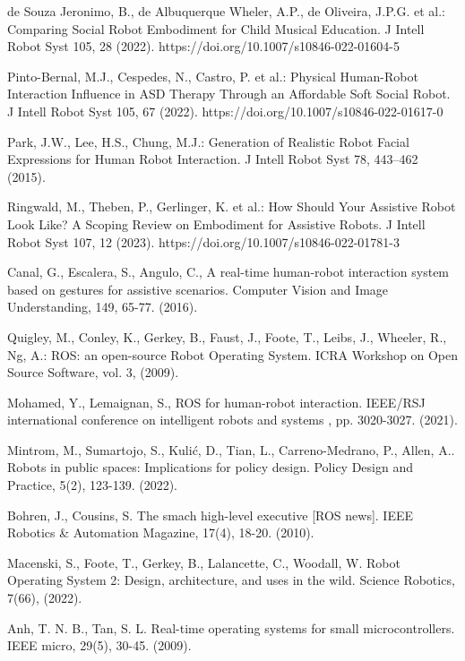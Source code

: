 \documentclass[runningheads]{llncs}
\begin{document}

\begin{thebibliography}{8}
de Souza Jeronimo, B., de Albuquerque Wheler, A.P., de Oliveira, J.P.G. et al.: Comparing Social Robot Embodiment for Child Musical Education. J Intell Robot Syst 105, 28 (2022). https://doi.org/10.1007/s10846-022-01604-5

Pinto-Bernal, M.J., Cespedes, N., Castro, P. et al.: Physical Human-Robot Interaction Influence in ASD Therapy Through an Affordable Soft Social Robot. J Intell Robot Syst 105, 67 (2022). https://doi.org/10.1007/s10846-022-01617-0

Park, J.W., Lee, H.S., Chung, M.J.: Generation of Realistic Robot Facial Expressions for Human Robot Interaction. J Intell Robot Syst 78, 443–462 (2015). 

Ringwald, M., Theben, P., Gerlinger, K. et al.: How Should Your Assistive Robot Look Like? A Scoping Review on Embodiment for Assistive Robots. J Intell Robot Syst 107, 12 (2023). https://doi.org/10.1007/s10846-022-01781-3

Canal, G., Escalera, S., Angulo, C., A real-time human-robot interaction system based on gestures for assistive scenarios. Computer Vision and Image Understanding, 149, 65-77. (2016).

Quigley, M., Conley, K., Gerkey, B., Faust, J., Foote, T., Leibs, J., Wheeler, R., Ng, A.: ROS: an open-source Robot Operating System. ICRA Workshop on Open Source Software, vol. 3, (2009).

Mohamed, Y., Lemaignan, S., ROS for human-robot interaction. IEEE/RSJ international conference on intelligent robots and systems , pp. 3020-3027. (2021).

Mintrom, M., Sumartojo, S., Kulić, D., Tian, L., Carreno-Medrano, P., Allen, A.. Robots in public spaces: Implications for policy design. Policy Design and Practice, 5(2), 123-139. (2022).

Bohren, J., Cousins, S. The smach high-level executive [ROS news]. IEEE Robotics \& Automation Magazine, 17(4), 18-20. (2010).

Macenski, S., Foote, T., Gerkey, B., Lalancette, C., Woodall, W. Robot Operating System 2: Design, architecture, and uses in the wild. Science Robotics, 7(66), (2022).

Anh, T. N. B., Tan, S. L. Real-time operating systems for small microcontrollers. IEEE micro, 29(5), 30-45. (2009).


\end{thebibliography}
\end{document}
